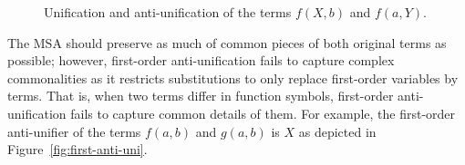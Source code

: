 \begin{figure} [t]
\centering{}
  \caption{Unification and anti-unification of the terms $f(X,b)$ and $f(a,Y)$.}
  \label{fig:uni-anti-uni}
\end{figure}

The MSA should preserve as much of common pieces of both original terms as possible; however, first-order anti-unification fails to capture complex commonalities as it restricts substitutions to only replace first-order variables by terms. That is, when two terms differ in function symbols, first-order anti-unification fails to capture common details of them. For example, the first-order anti-unifier of the terms $f(a,b)$ and $g(a,b)$ is $X$ as depicted in Figure~\ref{fig:first-anti-uni}.

